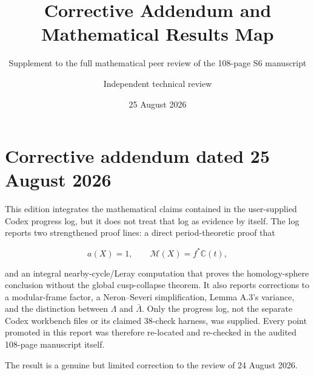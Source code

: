 \documentclass[
  10pt,
  letterpaper,
]{article}
\title{Corrective Addendum and Mathematical Results Map}
\subtitle{Supplement to the full mathematical peer review of the
108-page S6 manuscript}
\author{Independent technical review}
\date{25 August 2026}
\begin{document}
\maketitle

\section{Corrective addendum dated 25 August
2026}\label{corrective-addendum-dated-25-august-2026}

This edition integrates the mathematical claims contained in the
user-supplied Codex progress log, but it does not treat that log as
evidence by itself. The log reports two strengthened proof lines: a
direct period-theoretic proof that

\[
a(X)=1,
\qquad
\mathcal M(X)=f^*\mathbb C(t),
\]

and an integral nearby-cycle/Leray computation that proves the
homology-sphere conclusion without the global cusp-collapse theorem. It
also reports corrections to a modular-frame factor, a Neron--Severi
simplification, Lemma A.3's variance, and the distinction between
\(\Lambda\) and \(\bar\Lambda\). Only the progress log, not the separate
Codex workbench files or its claimed 38-check harness, was supplied.
Every point promoted in this report was therefore re-located and
re-checked in the audited 108-page manuscript itself.

The result is a genuine but limited correction to the review of 24
August 2026.
\end{document}
